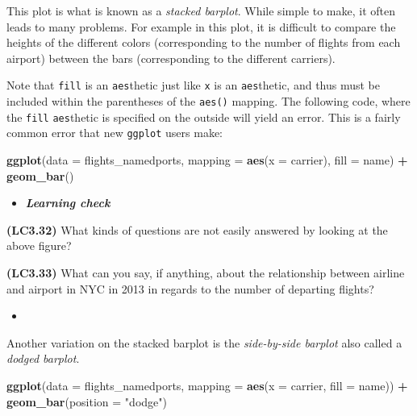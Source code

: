 \documentclass[12pt,]{krantz}
\makeatletter
\newenvironment{Shaded}{\begin{snugshade}}{\end{snugshade}}
\newcommand{\KeywordTok}[1]{\textcolor[rgb]{0.27,0.27,0.27}{\textbf{#1}}}
\newcommand{\DataTypeTok}[1]{\textcolor[rgb]{0.27,0.27,0.27}{#1}}
\newcommand{\StringTok}[1]{\textcolor[rgb]{0.5,0.5,0.5}{#1}}
\newcommand{\OperatorTok}[1]{\textcolor[rgb]{0.43,0.43,0.43}{\textbf{#1}}}
\newcommand{\NormalTok}[1]{#1}
\newenvironment{kframe}{%
\medskip{}
\setlength{\fboxsep}{.8em}
 \def\at@end@of@kframe{}%
 \ifinner\ifhmode%
  \def\at@end@of@kframe{\end{minipage}}%
  \begin{minipage}{\columnwidth}%
 \fi\fi%
 \def\FrameCommand##1{\hskip\@totalleftmargin \hskip-\fboxsep
 \colorbox{shadecolor}{##1}\hskip-\fboxsep
     \hskip-\linewidth \hskip-\@totalleftmargin \hskip\columnwidth}%
 \MakeFramed {\advance\hsize-\width
   \@totalleftmargin\z@ \linewidth\hsize
   \@setminipage}}%
 {\par\unskip\endMakeFramed%
 \at@end@of@kframe}
\renewenvironment{Shaded}{\begin{kframe}}{\end{kframe}}
\newenvironment{rmdblock}[1]
  {\begin{shaded*}
  \begin{itemize}
  \renewcommand{\labelitemi}{
    \raisebox{-.7\height}[0pt][0pt]{
    }
  }
  \item
  }
  {
  \end{itemize}
  \end{shaded*}
  }
\newenvironment{learncheck}
  {\begin{rmdblock}{warning}}
  {\end{rmdblock}}
\makeatother
\begin{document}
This plot is what is known as a \emph{stacked barplot}. While simple to
make, it often leads to many problems. For example in this plot, it is
difficult to compare the heights of the different colors (corresponding
to the number of flights from each airport) between the bars
(corresponding to the different carriers).

Note that \texttt{fill} is an \texttt{aes}thetic just like \texttt{x} is
an \texttt{aes}thetic, and thus must be included within the parentheses
of the \texttt{aes()} mapping. The following code, where the
\texttt{fill} \texttt{aes}thetic is specified on the outside will yield
an error. This is a fairly common error that new \texttt{ggplot} users
make:

\begin{Shaded}
\begin{Highlighting}[]
\KeywordTok{ggplot}\NormalTok{(}\DataTypeTok{data =}\NormalTok{ flights_namedports, }
       \DataTypeTok{mapping =} \KeywordTok{aes}\NormalTok{(}\DataTypeTok{x =}\NormalTok{ carrier), }\DataTypeTok{fill =}\NormalTok{ name) }\OperatorTok{+}
\StringTok{  }\KeywordTok{geom_bar}\NormalTok{()}
\end{Highlighting}
\end{Shaded}

\begin{learncheck}
\textbf{\emph{Learning check}}
\end{learncheck}

\textbf{(LC3.32)} What kinds of questions are not easily answered by
looking at the above figure?

\textbf{(LC3.33)} What can you say, if anything, about the relationship
between airline and airport in NYC in 2013 in regards to the number of
departing flights?

\begin{learncheck}

\end{learncheck}

Another variation on the stacked barplot is the \emph{side-by-side
barplot} also called a \emph{dodged barplot}.

\begin{Shaded}
\begin{Highlighting}[]
\KeywordTok{ggplot}\NormalTok{(}\DataTypeTok{data =}\NormalTok{ flights_namedports, }
       \DataTypeTok{mapping =} \KeywordTok{aes}\NormalTok{(}\DataTypeTok{x =}\NormalTok{ carrier, }\DataTypeTok{fill =}\NormalTok{ name)) }\OperatorTok{+}
\StringTok{  }\KeywordTok{geom_bar}\NormalTok{(}\DataTypeTok{position =} \StringTok{"dodge"}\NormalTok{)}
\end{Highlighting}
\end{Shaded}
\end{document}
